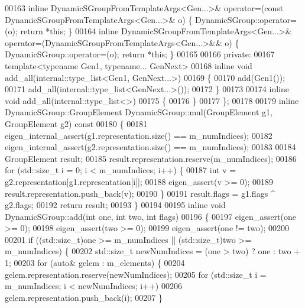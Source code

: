 \begin{DoxyCode}
00163     \textcolor{keyword}{inline} DynamicSGroupFromTemplateArgs<Gen...>& operator=(\textcolor{keyword}{const} DynamicSGroupFromTemplateArgs<Gen...>& o)
       \{ DynamicSGroup::operator=(o); \textcolor{keywordflow}{return} *\textcolor{keyword}{this}; \}
00164     \textcolor{keyword}{inline} DynamicSGroupFromTemplateArgs<Gen...>& operator=(DynamicSGroupFromTemplateArgs<Gen...>&& o) \{ 
      DynamicSGroup::operator=(o); \textcolor{keywordflow}{return} *\textcolor{keyword}{this}; \}
00165   
00166   \textcolor{keyword}{private}:
00167     \textcolor{keyword}{template}<\textcolor{keyword}{typename} Gen1, \textcolor{keyword}{typename}... GenNext>
00168     \textcolor{keyword}{inline} \textcolor{keywordtype}{void} add\_all(internal::type\_list<Gen1, GenNext...>)
00169     \{
00170       add(Gen1());
00171       add\_all(internal::type\_list<GenNext...>());
00172     \}
00173 
00174     \textcolor{keyword}{inline} \textcolor{keywordtype}{void} add\_all(internal::type\_list<>)
00175     \{
00176     \}
00177 \};
00178 
00179 \textcolor{keyword}{inline} DynamicSGroup::GroupElement DynamicSGroup::mul(GroupElement g1, GroupElement g2)\textcolor{keyword}{ const}
00180 \textcolor{keyword}{}\{
00181   eigen\_internal\_assert(g1.representation.size() == m\_numIndices);
00182   eigen\_internal\_assert(g2.representation.size() == m\_numIndices);
00183 
00184   GroupElement result;
00185   result.representation.reserve(m\_numIndices);
00186   \textcolor{keywordflow}{for} (std::size\_t i = 0; i < m\_numIndices; i++) \{
00187     \textcolor{keywordtype}{int} v = g2.representation[g1.representation[i]];
00188     eigen\_assert(v >= 0);
00189     result.representation.push\_back(v);
00190   \}
00191   result.flags = g1.flags ^ g2.flags;
00192   \textcolor{keywordflow}{return} result;
00193 \}
00194 
00195 \textcolor{keyword}{inline} \textcolor{keywordtype}{void} DynamicSGroup::add(\textcolor{keywordtype}{int} one, \textcolor{keywordtype}{int} two, \textcolor{keywordtype}{int} flags)
00196 \{
00197   eigen\_assert(one >= 0);
00198   eigen\_assert(two >= 0);
00199   eigen\_assert(one != two);
00200 
00201   \textcolor{keywordflow}{if} ((std::size\_t)one >= m\_numIndices || (std::size\_t)two >= m\_numIndices) \{
00202     std::size\_t newNumIndices = (one > two) ? one : two + 1;
00203     \textcolor{keywordflow}{for} (\textcolor{keyword}{auto}& gelem : m\_elements) \{
00204       gelem.representation.reserve(newNumIndices);
00205       \textcolor{keywordflow}{for} (std::size\_t i = m\_numIndices; i < newNumIndices; i++)
00206         gelem.representation.push\_back(i);
00207     \}

\end{DoxyCode}
